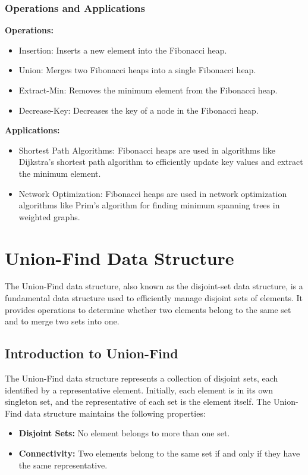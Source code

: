 \documentclass[12pt]{book} %
\begin{document}
\subsubsection{Operations and Applications}
\textbf{Operations:}
\begin{itemize}
    \item Insertion: Inserts a new element into the Fibonacci heap.
    \item Union: Merges two Fibonacci heaps into a single Fibonacci heap.
    \item Extract-Min: Removes the minimum element from the Fibonacci heap.
    \item Decrease-Key: Decreases the key of a node in the Fibonacci heap.
\end{itemize}

\textbf{Applications:}
\begin{itemize}
    \item Shortest Path Algorithms: Fibonacci heaps are used in algorithms like Dijkstra's shortest path algorithm to efficiently update key values and extract the minimum element.
    \item Network Optimization: Fibonacci heaps are used in network optimization algorithms like Prim's algorithm for finding minimum spanning trees in weighted graphs.
\end{itemize}

\section{Union-Find Data Structure}

The Union-Find data structure, also known as the disjoint-set data structure, is a fundamental data structure used to efficiently manage disjoint sets of elements. It provides operations to determine whether two elements belong to the same set and to merge two sets into one.

\subsection{Introduction to Union-Find}

The Union-Find data structure represents a collection of disjoint sets, each identified by a representative element. Initially, each element is in its own singleton set, and the representative of each set is the element itself. The Union-Find data structure maintains the following properties:

\begin{itemize}
    \item \textbf{Disjoint Sets:} No element belongs to more than one set.
    \item \textbf{Connectivity:} Two elements belong to the same set if and only if they have the same representative.
\end{itemize}
\end{document}
